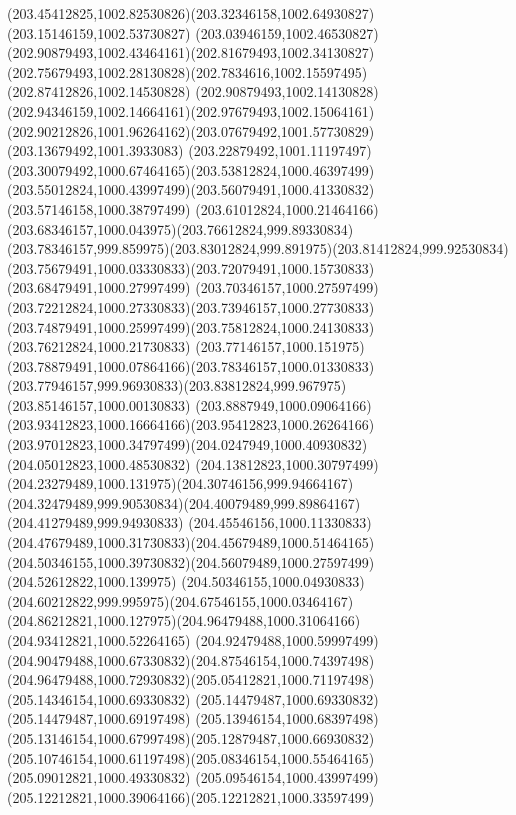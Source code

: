 {    \curveto(203.45412825,1002.82530826)(203.32346158,1002.64930827)(203.15146159,1002.53730827)
    \curveto(203.03946159,1002.46530827)(202.90879493,1002.43464161)(202.81679493,1002.34130827)
    \curveto(202.75679493,1002.28130828)(202.7834616,1002.15597495)(202.87412826,1002.14530828)
    \curveto(202.90879493,1002.14130828)(202.94346159,1002.14664161)(202.97679493,1002.15064161)
    \curveto(202.90212826,1001.96264162)(203.07679492,1001.57730829)(203.13679492,1001.3933083)
    \curveto(203.22879492,1001.11197497)(203.30079492,1000.67464165)(203.53812824,1000.46397499)
    \curveto(203.55012824,1000.43997499)(203.56079491,1000.41330832)(203.57146158,1000.38797499)
    \curveto(203.61012824,1000.21464166)(203.68346157,1000.043975)(203.76612824,999.89330834)
    \curveto(203.78346157,999.859975)(203.83012824,999.891975)(203.81412824,999.92530834)
    \curveto(203.75679491,1000.03330833)(203.72079491,1000.15730833)(203.68479491,1000.27997499)
    \curveto(203.70346157,1000.27597499)(203.72212824,1000.27330833)(203.73946157,1000.27730833)
    \curveto(203.74879491,1000.25997499)(203.75812824,1000.24130833)(203.76212824,1000.21730833)
    \curveto(203.77146157,1000.151975)(203.78879491,1000.07864166)(203.78346157,1000.01330833)
    \curveto(203.77946157,999.96930833)(203.83812824,999.967975)(203.85146157,1000.00130833)
    \curveto(203.8887949,1000.09064166)(203.93412823,1000.16664166)(203.95412823,1000.26264166)
    \curveto(203.97012823,1000.34797499)(204.0247949,1000.40930832)(204.05012823,1000.48530832)
    \curveto(204.13812823,1000.30797499)(204.23279489,1000.131975)(204.30746156,999.94664167)
    \curveto(204.32479489,999.90530834)(204.40079489,999.89864167)(204.41279489,999.94930833)
    \curveto(204.45546156,1000.11330833)(204.47679489,1000.31730833)(204.45679489,1000.51464165)
    \curveto(204.50346155,1000.39730832)(204.56079489,1000.27597499)(204.52612822,1000.139975)
    \curveto(204.50346155,1000.04930833)(204.60212822,999.995975)(204.67546155,1000.03464167)
    \curveto(204.86212821,1000.127975)(204.96479488,1000.31064166)(204.93412821,1000.52264165)
    \curveto(204.92479488,1000.59997499)(204.90479488,1000.67330832)(204.87546154,1000.74397498)
    \curveto(204.96479488,1000.72930832)(205.05412821,1000.71197498)(205.14346154,1000.69330832)
    \lineto(205.14479487,1000.69330832)
    \lineto(205.14479487,1000.69197498)
    \curveto(205.13946154,1000.68397498)(205.13146154,1000.67997498)(205.12879487,1000.66930832)
    \curveto(205.10746154,1000.61197498)(205.08346154,1000.55464165)(205.09012821,1000.49330832)
    \curveto(205.09546154,1000.43997499)(205.12212821,1000.39064166)(205.12212821,1000.33597499)
}
